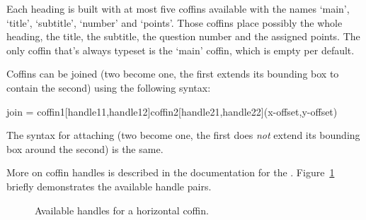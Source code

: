 \documentclass[load-preamble+,scrartcl={DIV10}]{cnltx-doc}
\begin{document}
\begin{sourcecode}
\end{sourcecode}

Each heading is built with at most five coffins available with the names
`main', `title', `subtitle', `number' and `points'.  Those coffins place
possibly the whole heading, the title, the subtitle, the question number and
the assigned points.  The only coffin that's always typeset is the `main'
coffin, which is empty per default.

Coffins can be joined (two become one, the first extends its bounding box to
contain the second) using the following syntax:
\begin{sourcecode}
  join = coffin1[handle11,handle12]coffin2[handle21,handle22](x-offset,y-offset)
\end{sourcecode}
The syntax for attaching (two become one, the first does \emph{not} extend its
bounding box around the second) is the same.

More on coffin handles is described in the documentation for the
.  Figure~\ref{fig:handles} briefly demonstrates the available
handle pairs.

\begin{figure}[ht]
 \centering
 \parbox{4.5cm}{%
   \NewCoffin\ExampleCoffin
   \SetHorizontalCoffin\ExampleCoffin{\color{gray!30}\rule{4cm}{4cm}}%
   \DisplayCoffinHandles{}%
 }
 \caption{Available handles for a horizontal coffin.}\label{fig:handles}
\end{figure}
\end{document}
